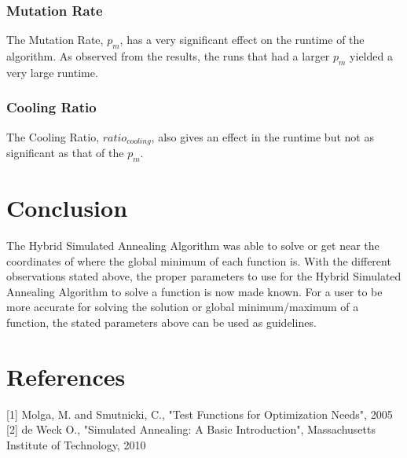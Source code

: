 \documentclass{article}
\begin{document}
\subsubsection{Mutation Rate}
The Mutation Rate, $p_m$, has a very significant effect on the runtime of the algorithm. As observed from the results, the runs that had a larger $p_m$ yielded a very large runtime.

\subsubsection{Cooling Ratio}
The Cooling Ratio, $ratio_{cooling}$, also gives an effect in the runtime but not as significant as that of the $p_m$.

\section{Conclusion}
The Hybrid Simulated Annealing Algorithm was able to solve or get near the coordinates of where the global minimum of each function is. With the different observations stated above, the proper parameters to use for the Hybrid Simulated Annealing Algorithm to solve a function is now made known. For a user to be more accurate for solving the solution or global minimum/maximum of a function, the stated parameters above can be used as guidelines.

\section{References}
[1] Molga, M. and Smutnicki, C., "Test Functions for Optimization Needs", 2005
\\

[2] de Weck O.,  "Simulated Annealing: A Basic Introduction", Massachusetts Institute of Technology, 2010 
\end{document}
